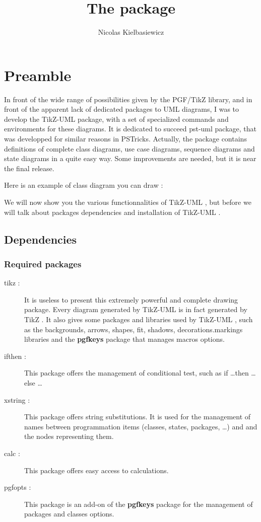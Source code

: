 \documentclass[a4paper,11pt]{report}
\title{The \tuml package} %
\author{Nicolas {\sc Kielbasiewicz}} %
\newcommand{\inputTikZ}[1]{%
  }%
\newcommand{\inputTikZ}[1]{%
    \texttt{[image: fig/\#1.pdf]}%
  }%
\newcommand{\tuml}{{\sc TikZ-UML} \xspace}
\newcommand{\TikZ}{{\sc TikZ} \xspace}
\begin{document}
\maketitle

\tableofcontents

\chapter*{Preamble}

In front of the wide range of possibilities given by the {\sc PGF/TikZ} library, and in front of the apparent lack of dedicated packages to UML diagrams, I was to develop the \tuml package, with a set of specialized commands and environments for these diagrams. 
It is dedicated to succeed pst-uml package, that was developped for similar reasons in {\sc PSTricks}. Actually, the package contains definitions of complete class diagrams, use case diagrams, sequence diagrams and state diagrams in a quite easy way. Some improvements are needed, but it is near the final release. 

Here is an example of class diagram you can draw :

\begin{center}
\inputTikZ{classdiagex}
\end{center}

We will now show you the various functionnalities of \tuml, but before we will talk about packages dependencies and installation of \tuml.

\section*{Dependencies}

\subsection*{Required packages}

\begin{description}
\item[tikz :] It is useless to present this extremely powerful and complete drawing package. Every diagram generated by \tuml is in fact generated by \TikZ. It also gives some packages and libraries used by \tuml, such as the backgrounds, arrows, shapes, fit, shadows, decorations.markings libraries and the {\bf pgfkeys} package that manages macros options.
\item[ifthen :] This package offers the management of conditional test, such as if \ldots then \ldots else \ldots
\item[xstring :] This package offers string substitutions. It is used for the management of names between programmation items (classes, states, packages, \ldots) and and the nodes representing them.
\item[calc :] This package offers easy access to calculations.
\item[pgfopts :] This package is an add-on of the {\bf pgfkeys} package for the management of packages and classes options.
\end{description}
\end{document}
